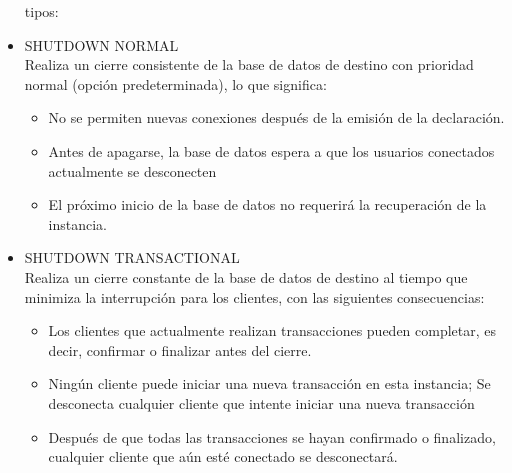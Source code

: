 \begin{itemize}
tipos:

\item SHUTDOWN NORMAL
	\\Realiza un cierre consistente de la base de datos de destino con prioridad normal (opción predeterminada), lo que significa:
		
		\begin{itemize}
			\item No se permiten nuevas conexiones después de la emisión de la declaración.
			\item Antes de apagarse, la base de datos espera a que los usuarios conectados actualmente se desconecten
			\item El próximo inicio de la base de datos no requerirá la recuperación de la instancia.
			
		\end{itemize}


\item SHUTDOWN TRANSACTIONAL
	\\Realiza un cierre constante de la base de datos de destino al tiempo que minimiza la interrupción para los clientes, con las siguientes consecuencias:
		
		\begin{itemize}
			\item Los clientes que actualmente realizan transacciones pueden completar, es decir, confirmar o finalizar antes del cierre.
			\item Ningún cliente puede iniciar una nueva transacción en esta instancia; Se desconecta cualquier cliente que intente iniciar una nueva transacción
			\item Después de que todas las transacciones se hayan confirmado o finalizado, cualquier cliente que aún esté conectado se desconectará.
			
		\end{itemize}




\end{itemize} 